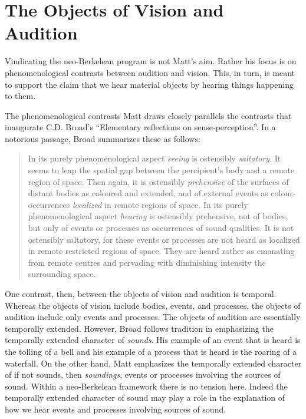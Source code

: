 \documentclass[12pt]{article}
\begin{document}

\section{The Objects of Vision and Audition} %
\label{sec:the_objects_of_vision_and_audition}

Vindicating the neo-Berkelean program is not Matt's aim. Rather his focus is on phenomenological contrasts between audition and vision. This, in turn, is meant to support the claim that we hear material objects by hearing things happening to them.

The phenomenological contrasts Matt draws closely parallels the contrasts that inaugurate C.D. Broad's \citeyearpar{Broad:1965dq} ``Elementary reflections on sense-perception''. %
In a notorious passage, Broad summarizes these as follows:
\begin{quote}
	In its purely phenomenological aspect \emph{seeing} is ostensibly \emph{saltatory}. It seems to leap the spatial gap between the percipient's body and a remote region of space. Then again, it is ostensibly \emph{prehensive} of the surfaces of distant bodies as coloured and extended, and of external events as colour-occurrences \emph{localized} in remote regions of space. In its purely phenomenological aspect \emph{hearing} is ostensibly prehensive, not of bodies, but only of events or processes as occurrences of sound qualities. It is not ostensibly saltatory, for these events or processes are not heard as localized in remote restricted regions of space. They are heard rather as emanating from remote centres and pervading with diminishing intensity the surrounding space.
\end{quote}

One contrast, then, between the objects of vision and audition is temporal. Whe\-re\-as the objects of vision include bodies, events, and processes, the objects of audition include only events and processes. The objects of audition are essentially temporally extended. However, Broad follows tradition in emphasizing the temporally extended character of \emph{sounds}. His example of an event that is heard is the tolling of a bell and his example of a process that is heard is the roaring of a waterfall. On the other hand, Matt emphasizes the temporally extended character of if not sounds, then \emph{soundings}, events or processes involving the sources of sound. Within a neo-Berkelean framework there is no tension here. Indeed the temporally extended character of sound may play a role in the explanation of how we hear events and processes involving sources of sound. 
\end{document}
